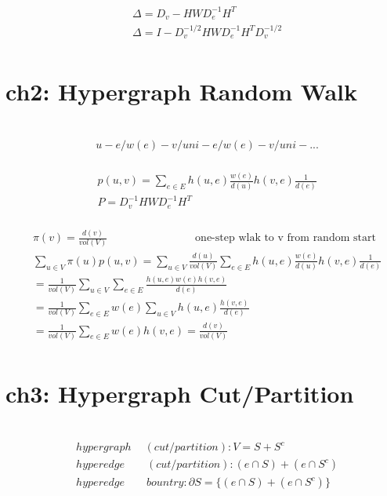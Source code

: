 \documentclass{article}
\begin{document}
%
\begin{align*}
    & \Delta = D_{v} - H W D_{e}^{-1} H^{T} \\[3pt]
    & \Delta = I - D_{v}^{-1/2} H W D_{e}^{-1} H^{T} D_{v}^{-1/2} \\[3pt]
\end{align*}


\newpage
\section*{ch2: Hypergraph Random Walk}


~ \\[3pt]
%
\begin{align*}
    & u-e/w(e)-v/uni-e/w(e)-v/uni-...  \\[3pt]
\end{align*}


%
\begin{align*}
    & p(u, v) = \sum_{e \in E} 
                h(u, e) \frac{w(e)}{d(u)} 
                h(v, e) \frac{1}{d(e)}  \\[3pt]
    & P = D_{v}^{-1} H W D_{e}^{-1} H^{T}  \\[3pt]
\end{align*}


%
\begin{align*}
    & \pi (v) = \frac{d(v)}{vol(V)} \qquad \qquad \qquad \qquad 
      \text{one-step wlak to v from random start}  \\[3pt]
    & \sum_{u \in V} \pi (u) p(u, v) = 
      \sum_{u \in V} \frac{d(u)}{vol(V)} 
      \sum_{e \in E} h(u, e) \frac{w(e)}{d(u)} h(v, e) \frac{1}{d(e)} \\[3pt]
    & = \frac{1}{vol(V)} \sum_{u \in V} \sum_{e \in E} 
        \frac{h(u, e)w(e)h(v, e)}{d(e)} \\[3pt]
    & = \frac{1}{vol(V)} \sum_{e \in E} w(e) 
        \sum_{u \in V} h(u, e) \frac{h(v, e)}{d(e)} \\[3pt]
    & = \frac{1}{vol(V)} \sum_{e \in E} w(e) h(v, e) = \frac{d(v)}{vol(V)}  \\[3pt]
\end{align*}


\newpage
\section*{ch3: Hypergraph Cut/Partition}


~ \\[3pt]
%
\begin{align*}
    & hypergraph \quad \ (cut/partition): V = S + S^{c}  \\[3pt]
    & hyperedge \qquad (cut/partition): (e \cap S) + (e \cap S^{c})  \\[3pt]
    & hyperedge \qquad bountry: \partial S = \{ (e \cap S) + (e \cap S^{c}) \}  \\[3pt]
\end{align*}
\end{document}
